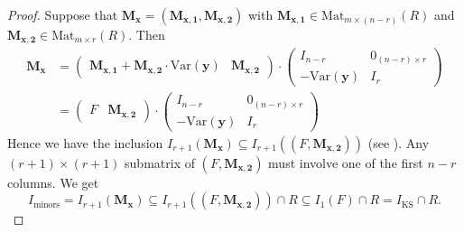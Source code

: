 \documentclass[a4paper, 11pt]{amsart}
\newcommand{\td}[1]{\bm{#1}}
\newcommand{\tx}[1]{\text{#1}}
\theoremstyle{definition}
\theoremstyle{definition}
\begin{document}
	
	\begin{proof}
		Suppose that $\td{M_x}=(\td{M_{x,1}},\td{M_{x,2}})$ with $\td{M_{x,1}}\in\tx{Mat}_{m\times (n-r)}(R)$ and $\td{M_{x,2}}\in\tx{Mat}_{m\times r}(R)$. Then 
		\begin{align*}
			\td{M_x}&=\begin{pmatrix}
				\td{M_{x,1}}+\td{M_{x,2}}\cdot\tx{Var}(\td{y})&\td{M_{x,2}}
			\end{pmatrix}\cdot\begin{pmatrix}
				I_{n-r}&0_{(n-r)\times r}\\
				-\tx{Var}(\td{y})&I_r
			\end{pmatrix}\\&=\begin{pmatrix}
				F&\td{M_{x,2}}
			\end{pmatrix}\cdot\begin{pmatrix}
				I_{n-r}&0_{(n-r)\times r}\\
				-\tx{Var}(\td{y})&I_r
			\end{pmatrix}
		\end{align*}
		Hence we have the inclusion $I_{r+1}(\td{M_x})\subseteq I_{r+1}((F,\td{M_{x,2}}))$ (see \cite[pp. 740, (1)]{Lang}). Any $(r+1)\times(r+1)$ submatrix of $(F,\td{M_{x,2}})$ must involve one of the first $n-r$ columns. We get
		\begin{equation*}
			I_{\tx{minors}}=I_{r+1}(\td{M_x})\subseteq I_{r+1}((F,\td{M_{x,2}}))\cap R\subseteq I_1(F)\cap R=I_{\tx{KS}}\cap R.
		\end{equation*}
		

\end{proof}
\end{document}
